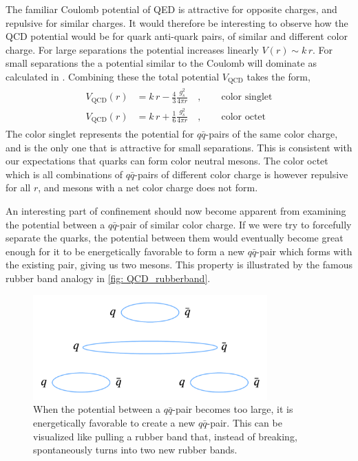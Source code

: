 \documentclass[main.tex]{subfiles}
\begin{document}
The familiar Coulomb potential of QED is attractive for opposite charges, and repulsive for similar charges. It would therefore be interesting to observe how the QCD potential would be for quark anti-quark pairs, of similar and different color charge. For large separations the potential increases linearly \(V(r) \sim k\, r\). For small separations the a potential similar to the Coulomb will dominate as calculated in \cite[p.512-513]{schwartz2014quantum}. Combining these the total potential \(V_{\text{QCD}}\) takes the form,
\begin{align}\label{eqn: QCD_potential}
    \begin{split}
    V_{\text{QCD}}(r) &= k\,r - \frac{4}{3} \frac{g_s^2}{4\pi r} \quad, \qquad \text{color singlet} \\
    V_{\text{QCD}}(r) &= k\,r + \frac{1}{6} \frac{g_s^2}{4\pi r} \quad, \qquad \text{color octet}
    \end{split}
\end{align}
The color singlet represents the potential for \(q \bar q\)-pairs of the same color charge, and is the only one that is attractive for small separations. This is consistent with our expectations that quarks can form color neutral mesons. The color octet which is all combinations of \(q \bar q\)-pairs of different color charge is however repulsive for all \(r\), and mesons with a net color charge does not form. 

An interesting part of confinement should now become apparent from examining the potential between a \(q \bar q\)-pair of similar color charge. If we were try to forcefully separate the quarks, the potential between them would eventually become great enough for it to be energetically favorable to form a new \(q \bar q\)-pair which forms with the existing pair, giving us two mesons. This property is illustrated by the famous rubber band analogy in \autoref{fig: QCD_rubberband}. 
\begin{figure}[htb]
    \centering
    \includegraphics[width=9cm]{pictures/figures/QCD_potential_rubberband.png}
    \caption{When the potential between a \(q\bar q\)-pair becomes too large, it is energetically favorable to create a new \(q\bar q\)-pair. This can be visualized like pulling a rubber band that, instead of breaking, spontaneously turns into two new rubber bands.}
    \label{fig: QCD_rubberband}
\end{figure}
\end{document}
